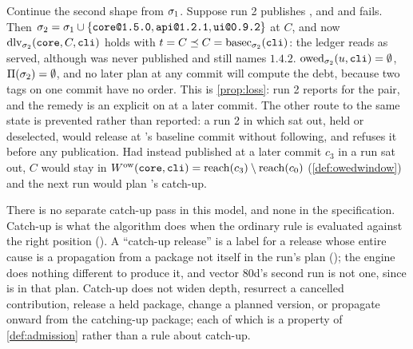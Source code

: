 \begin{example}
\label{ex:e201}
Continue the second shape from $\sigma_1$. Suppose run 2 publishes ,
 and  and  fails. Then $\sigma_2 = \sigma_1 \cup
\{\texttt{core@1.5.0}, \texttt{api@1.2.1}, \texttt{ui@0.9.2}\}$ at $C$, and now
$\mathrm{dlv}_{\sigma_2}(\texttt{core},C,\texttt{cli})$ holds with $t = C \preceq C =
\mathrm{basec}_{\sigma_2}(\texttt{cli})$: the ledger reads  as served, although
 was never published and  still names
$1.4.2$. $\mathrm{owed}_{\sigma_2}(u,\texttt{cli}) = \emptyset$, $\Pi(\sigma_2) = \emptyset$,
and no later plan at any commit will compute the debt, because two tags on one
commit have no order. This is \cref{prop:loss}: run 2 reports 
for the pair, and the remedy is an explicit  on 
at a later commit. The other route to the same state is prevented rather
than reported: a run 2 in which  sat out, held or deselected, would
release  at 's baseline commit without 
following, and  refuses it before any publication. Had 
instead published at a later commit $c_3$ in a run  sat out, $C$
would stay in $W^{\mathrm{ow}}_{}(\texttt{core},\texttt{cli}) = \mathrm{reach}(c_3)\setminus\mathrm{reach}(c_0)$
(\cref{def:owedwindow}) and the next run would plan 's catch-up.
\end{example}

\begin{remark}
There is no separate catch-up pass in this model, and none in the
specification. Catch-up is what the algorithm does when the ordinary rule is
evaluated against the right position (). A ``catch-up release'' is
a label for a release whose entire cause is a propagation from a package not
itself in the run's plan (); the engine does nothing different to
produce it, and vector 80d's second run is not one, since  is in
that plan. Catch-up does not widen depth, resurrect a cancelled contribution,
release a held package, change a planned version, or propagate onward from the
catching-up package; each of which is a property of \cref{def:admission}
rather than a rule about catch-up.
\end{remark}
